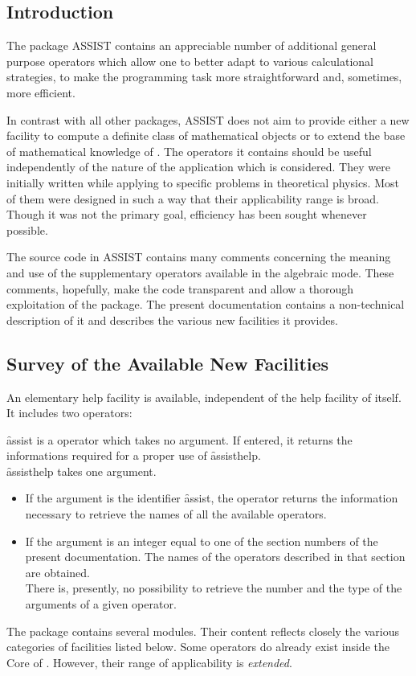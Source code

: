 


\subsection{Introduction}
The package \textsc{ASSIST} contains
an appreciable number of additional general purpose operators which allow
one to better adapt \REDUCE to various calculational strategies,
to make the programming task more straightforward and, sometimes,
more efficient.

In contrast with all other packages, \textsc{ASSIST} does not aim to provide either a
new facility to compute a definite class of mathematical objects or to extend
the base of mathematical knowledge of \REDUCE.
The operators it contains should be
useful independently of the nature of the application which is considered.
They were initially written while applying \REDUCE to specific problems in
theoretical physics. Most of them were designed
in such a way that their applicability range is broad. Though it was not
the primary goal, efficiency has been sought whenever possible.

The source code in \textsc{ASSIST} contains many comments concerning
the meaning and use of the supplementary operators available
in the algebraic mode. These comments, hopefully, make the code transparent
and allow a thorough exploitation of the package. The present documentation
contains a non-technical description of it and describes the
various new facilities it provides.

\subsection{Survey of the Available New Facilities}
An elementary help facility is available, independent of the
help facility of \REDUCE itself. It includes two operators:

\hypertarget{operator:ASSIST}{}
\hypertarget{operator:ASSISTHELP}{}
\f{assist} is a operator which takes no argument. If entered, it returns
the informations required for a proper use  of \f{assisthelp}.\\
\f{assisthelp} takes one argument.
\begin{itemize}
\item[i.] If the argument is the identifier \f{assist}, the operator
returns the information necessary to retrieve the names of all the available
operators.
\item[ii.] If the argument is an integer equal to one of the section numbers
of the present documentation. The names of the operators described
in that section are obtained.\\
There is, presently, no possibility to retrieve the number and the type of
the arguments of a given operator.
\end{itemize}
The package contains several modules. Their content reflects closely
the various categories of facilities listed below. Some operators do
already exist inside the Core of \REDUCE. However, their range
of applicability is \emph{extended}.

